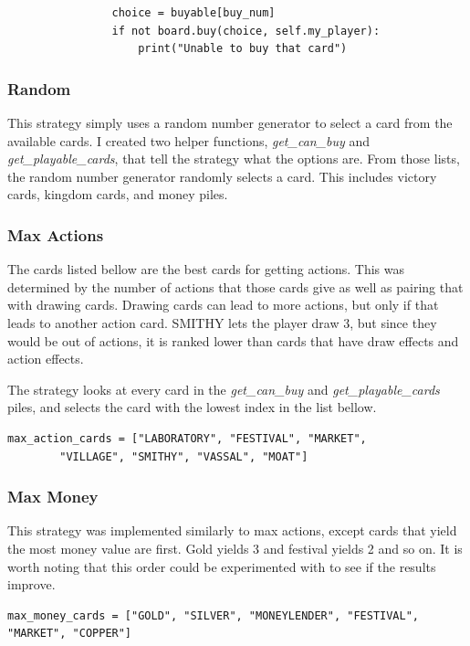 \documentclass[11pt, oneside]{article}   	%
\begin{document}
\begin{verbatim}
                choice = buyable[buy_num]
                if not board.buy(choice, self.my_player):
                    print("Unable to buy that card")
\end{verbatim}

\subsubsection{Random}

This strategy simply uses a random number generator to select a card from the available cards. I created two helper functions, \textit{get\_can\_buy} and \textit{get\_playable\_cards}, that tell the strategy what the options are. From those lists, the random number generator randomly selects a card. This includes victory cards, kingdom cards, and money piles. 

\subsubsection{Max Actions}

The cards listed bellow are the best cards for getting actions. This was determined by the number of actions that those cards give as well as pairing that with drawing cards. Drawing cards can lead to more actions, but only if that leads to another action card. SMITHY lets the player draw 3, but since they would be out of actions, it is ranked lower than cards that have draw effects and action effects. 

The strategy looks at every card in the \textit{get\_can\_buy} and \textit{get\_playable\_cards} piles, and selects the card with the lowest index in the list bellow. 

\begin{verbatim}
max_action_cards = ["LABORATORY", "FESTIVAL", "MARKET", 
		"VILLAGE", "SMITHY", "VASSAL", "MOAT"]
\end{verbatim}

\subsubsection{Max Money}

This strategy was implemented similarly to max actions, except cards that yield the most money value are first. Gold yields 3 and festival yields 2 and so on. It is worth noting that this order could be experimented with to see if the results improve. 

\begin{verbatim}
max_money_cards = ["GOLD", "SILVER", "MONEYLENDER", "FESTIVAL", "MARKET", "COPPER"]
\end{verbatim}
\end{document}
